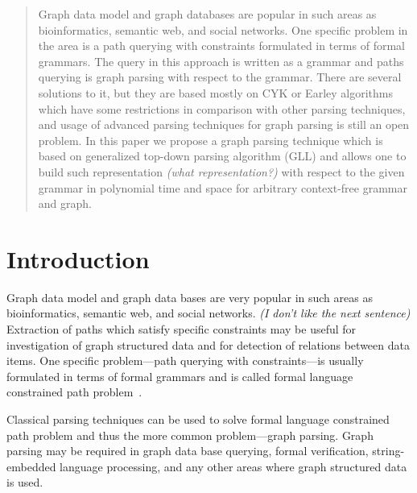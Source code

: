 \documentclass[runningheads,a4paper]{llncs}
\begin{document}
\begin{abstract}
Graph data model and graph databases are popular in such areas as bioinformatics, semantic web, and social networks.
One specific problem in the area is a path querying with constraints formulated in terms of formal grammars.
The query in this approach is written as a grammar and paths querying is graph parsing with respect to the grammar.
There are several solutions to it, but they are based mostly on CYK or Earley algorithms which have some restrictions in comparison with other parsing techniques, and usage of advanced parsing techniques for graph parsing is still an open problem.
In this paper we propose a graph parsing technique which is based on generalized top-down parsing algorithm (GLL) and allows one to build such representation \emph{(what representation?)} with respect to the given grammar in polynomial time and space for arbitrary context-free grammar and graph.


\end{abstract}






\section{Introduction}
Graph data model and graph data bases are very popular in such areas as bioinformatics, semantic web, and social networks.
\emph{(I don't like the next sentence)}
Extraction of paths which satisfy specific constraints may be useful for investigation of graph structured data and for detection of relations between data items.
One specific problem---path querying with constraints---is usually formulated in terms of formal grammars and is called formal language constrained path problem~\cite{FLCpathProblem}.

Classical parsing techniques can be used to solve formal language constrained path problem and thus the more common problem---graph parsing. 
Graph parsing may be required in graph data base querying, formal verification, string-embedded language processing, and any other areas where graph structured data is used. 
\end{document}
